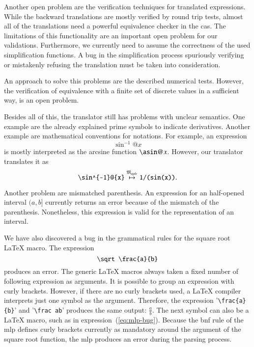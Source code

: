 Another open problem are the verification techniques for translated expressions. While the backward translations are mostly verified by round trip tests, almost all of the translations need a powerful equivalence checker in the \gls{cas}. The limitations of this functionality are an important open problem for our validations. Furthermore, we currently need to assume the correctness of the used simplification functions. A bug in the simplification process spuriously verifying or mistakenly refusing the translation must be taken into consideration.

An approach to solve this problems are the described numerical tests. However, the verification of equivalence with a finite set of discrete values in a sufficient way, is an open problem.

Besides all of this, the translator still has problems with unclear semantics. One example are the already explained prime symbols to indicate derivatives. Another example are mathematical conventions for notations. For example, an expression
\begin{equation}
\sin^{-1}@{x}
\end{equation}
is mostly interpreted as the arcsine function $\asin@{x}$. However, our translator translates it as
\begin{equation}
\verb|\sin^{-1}@{x}| \overset{\langMaple}{\mapsto} \verb|1/(sin(x))|.
\end{equation}

Another problem are mismatched parenthesis. An expression for an half-opened interval $(a,b]$ currently returns an error because of the mismatch of the parenthesis. Nonetheless, this expression is valid for the representation of an interval.

We have also discovered a bug in the grammatical rules for the square root \LaTeX{} macro. The expression
\begin{equation}\label{eq:mlp-bug}
\verb|\sqrt \frac{a}{b}|
\end{equation}
produces an error. The generic \LaTeX{} macros always taken a fixed number of following expression as arguments. It is possible to group an expression with curly brackets. However, if there are no curly brackets used, a \LaTeX{} compiler interprets just one symbol as the argument. Therefore, the expression '\verb|\frac{a}{b}|' and '\verb|\frac ab|' produces the same output: $\frac ab$. The next symbol can also be a \LaTeX{} macro, such as in expression~(\ref{eq:mlp-bug}). Because the \gls{bnf} rule of the \gls{mlp} defines curly brackets currently as mandatory around the argument of the square root function, the \gls{mlp} produces an error during the parsing process.